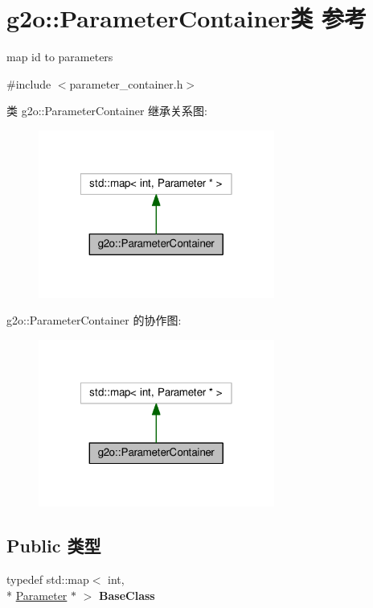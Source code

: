 \hypertarget{classg2o_1_1ParameterContainer}{\section{g2o\-:\-:Parameter\-Container类 参考}
\label{classg2o_1_1ParameterContainer}
}


map id to parameters  




{\ttfamily \#include $<$parameter\-\_\-container.\-h$>$}



类 g2o\-:\-:Parameter\-Container 继承关系图\-:
\nopagebreak
\begin{figure}[H]
\begin{center}
\leavevmode
\includegraphics[width=220pt]{classg2o_1_1ParameterContainer__inherit__graph}
\end{center}
\end{figure}


g2o\-:\-:Parameter\-Container 的协作图\-:
\nopagebreak
\begin{figure}[H]
\begin{center}
\leavevmode
\includegraphics[width=220pt]{classg2o_1_1ParameterContainer__coll__graph}
\end{center}
\end{figure}
\subsection*{Public 类型}
\begin{DoxyCompactItemize}
\item 
\hypertarget{classg2o_1_1ParameterContainer_a200fdfdce01f7fb5f96e02a8ddf666ac}{typedef std\-::map$<$ int, \\*
\hyperlink{classg2o_1_1Parameter}{Parameter} $\ast$ $>$ {\bfseries Base\-Class}}\label{classg2o_1_1ParameterContainer_a200fdfdce01f7fb5f96e02a8ddf666ac}

\end{DoxyCompactItemize}
